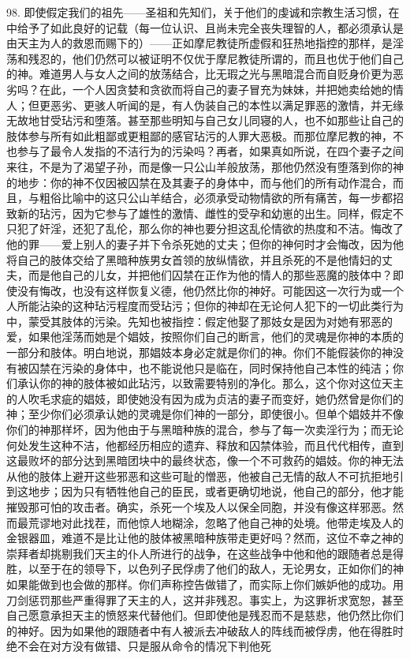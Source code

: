 98. 即使假定我们的祖先——圣祖和先知们，关于他们的虔诚和宗教生活习惯，在中给予了如此良好的记载（每一位认识、且尚未完全丧失理智的人，都必须承认是由天主为人的救恩而赐下的）——正如摩尼教徒所虚假和狂热地指控的那样，是淫荡和残忍的，他们仍然可以被证明不仅优于摩尼教徒所谓的，而且也优于他们自己的神。难道男人与女人之间的放荡结合，比无瑕之光与黑暗混合而自贬身价更为恶劣吗？在此，一个人因贪婪和贪欲而将自己的妻子冒充为妹妹，并把她卖给她的情人；但更恶劣、更骇人听闻的是，有人伪装自己的本性以满足罪恶的激情，并无缘无故地甘受玷污和堕落。甚至那些明知与自己女儿同寝的人，也不如那些让自己的肢体参与所有如此粗鄙或更粗鄙的感官玷污的人罪大恶极。而那位摩尼教的神，不也参与了最令人发指的不洁行为的污染吗？再者，如果真如所说，在四个妻子之间来往，不是为了渴望子孙，而是像一只公山羊般放荡，那他仍然没有堕落到你的神的地步：你的神不仅因被囚禁在及其妻子的身体中，而与他们的所有动作混合，而且，与粗俗比喻中的这只公山羊结合，必须承受动物情欲的所有痛苦，每一步都招致新的玷污，因为它参与了雄性的激情、雌性的受孕和幼崽的出生。同样，假定不只犯了奸淫，还犯了乱伦，那么你的神也要分担这乱伦情欲的热度和不洁。悔改了他的罪——爱上别人的妻子并下令杀死她的丈夫；但你的神何时才会悔改，因为他将自己的肢体交给了黑暗种族男女首领的放纵情欲，并且杀死的不是他情妇的丈夫，而是他自己的儿女，并把他们囚禁在正作为他的情人的那些恶魔的肢体中？即使没有悔改，也没有这样恢复义德，他仍然比你的神好。可能因这一次行为或一个人所能沾染的这种玷污程度而受玷污；但你的神却在无论何人犯下的一切此类行为中，蒙受其肢体的污染。先知也被指控：假定他娶了那妓女是因为对她有邪恶的爱，如果他淫荡而她是个娼妓，按照你们自己的断言，他们的灵魂是你神的本质的一部分和肢体。明白地说，那娼妓本身必定就是你们的神。你们不能假装你的神没有被囚禁在污染的身体中，也不能说他只是临在，同时保持他自己本性的纯洁；你们承认你的神的肢体被如此玷污，以致需要特别的净化。那么，这个你对这位天主的人吹毛求疵的娼妓，即使她没有因为成为贞洁的妻子而变好，她仍然曾是你们的神；至少你们必须承认她的灵魂是你们神的一部分，即使很小。但单个娼妓并不像你们的神那样坏，因为他由于与黑暗种族的混合，参与了每一次卖淫行为；而无论何处发生这种不洁，他都经历相应的遗弃、释放和囚禁体验，而且代代相传，直到这最败坏的部分达到黑暗团块中的最终状态，像一个不可救药的娼妓。你的神无法从他的肢体上避开这些邪恶和这些可耻的憎恶，他被自己无情的敌人不可抗拒地引到这地步；因为只有牺牲他自己的臣民，或者更确切地说，他自己的部分，他才能摧毁那可怕的攻击者。确实，杀死一个埃及人以保全同胞，并没有像这样邪恶。然而最荒谬地对此找茬，而他惊人地糊涂，忽略了他自己神的处境。他带走埃及人的金银器皿，难道不是比让他的肢体被黑暗种族带走更好吗？然而，这位不幸之神的崇拜者却挑剔我们天主的仆人所进行的战争，在这些战争中他和他的跟随者总是得胜，以至于在的领导下，以色列子民俘虏了他们的敌人，无论男女，正如你们的神如果能做到也会做的那样。你们声称控告做错了，而实际上你们嫉妒他的成功。用刀剑惩罚那些严重得罪了天主的人，这并非残忍。事实上，为这罪祈求宽恕，甚至自己愿意承担天主的愤怒来代替他们。但即使他是残忍而不是慈悲，他仍然比你们的神好。因为如果他的跟随者中有人被派去冲破敌人的阵线而被俘虏，他在得胜时绝不会在对方没有做错、只是服从命令的情况下判他死
